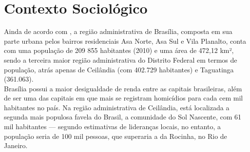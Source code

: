 \section{Contexto Sociológico}

Ainda de acordo com , a região administrativa de Brasília, composta em sua parte urbana pelos bairros residenciais Asa Norte, Asa Sul e Vila Planalto, conta com uma população de 209 855 habitantes (2010) e uma área de 472,12 km², sendo a terceira maior região administrativa do Distrito Federal em termos de população, atrás apenas de Ceilândia (com 402.729 habitantes) e Taguatinga (361.063).\\

Brasília possui a maior desigualdade de renda entre as capitais brasileiras, além de ser uma das capitais em que mais se registram homicídios para cada cem mil habitantes no país. Na região administrativa de Ceilândia, está localizada a segunda mais populosa favela do Brasil, a comunidade do Sol Nascente, com 61 mil habitantes — segundo estimativas de lideranças locais, no entanto, a população seria de 100 mil pessoas, que superaria a da Rocinha, no Rio de Janeiro.\\

